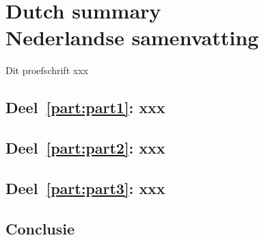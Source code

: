 \chapter[Dutch summary (Nederlandse samenvatting)]{Dutch summary \\ Nederlandse samenvatting}

\cleardoublepage

Dit proefschrift xxx

\section*{Deel~\ref{part:part1}: xxx}

\section*{Deel~\ref{part:part2}: xxx}

\section*{Deel~\ref{part:part3}: xxx}

\section*{Conclusie}

\clearpage
\thispagestyle{empty}
~
\cleardoublepage